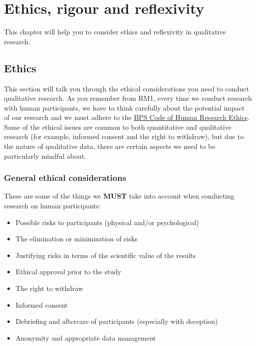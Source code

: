 \documentclass[
  english,
  letterpaper,
  DIV=11,
  numbers=noendperiod]{scrreprt}
\providecommand{\tightlist}{%
  \setlength{\itemsep}{0pt}\setlength{\parskip}{0pt}}
\begin{document}
\chapter{Ethics, rigour and reflexivity}\label{ch9_ethics}

This chapter will help you to consider ethics and reflexivity in
qualitative research.

\section{Ethics}\label{ethics}

This section will talk you through the ethical considerations you need
to conduct qualitative research. As you remember from RM1, every time we
conduct research with human participants, we have to think carefully
about the potential impact of our research and we must adhere to the
\href{https://cms.bps.org.uk/sites/default/files/2022-06/BPS\%20Code\%20of\%20Human\%20Research\%20Ethics\%20(1).pdf}{BPS
Code of Human Research Ethics}. Some of the ethical issues are common to
both quantitative and qualitative research (for example, informed
consent and the right to withdraw), but due to the nature of qualitative
data, there are certain aspects we need to be particularly mindful
about.

\subsection{General ethical
considerations}\label{general-ethical-considerations}

These are some of the things we \textbf{MUST} take into account when
conducting research on human participants:

\begin{itemize}
\tightlist
\item
  Possible risks to participants (physical and/or psychological)
\item
  The elimination or minimization of risks
\item
  Justifying risks in terms of the scientific value of the results
\item
  Ethical approval prior to the study
\item
  The right to withdraw
\item
  Informed consent
\item
  Debriefing and aftercare of participants (especially with deception)
\item
  Anonymity and appropriate data management
\end{itemize}
\end{document}
